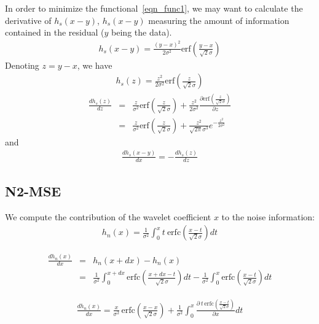 In order to minimize the functional~\ref{eqn_func1}, we may want to calculate
the derivative of $h_s(x-y)$, $h_s(x-y)$ measuring the amount of information
contained in the residual ($y$ being the data).
\begin{eqnarray}
h_s(x-y) = \frac{(y-x)^2}{2\sigma^2}\mbox{erf}(\frac{y-x}{\sqrt{2}\sigma}) 
\end{eqnarray}
Denoting $z = y - x$, we have
\begin{eqnarray}
h_s(z) = \frac{z^2}{2\sigma^2}\mbox{erf}(\frac{z}{\sqrt{2}\sigma}) 
\end{eqnarray}
\begin{eqnarray}
\frac{ d h_{s}(z)}{dz} & = & \frac{z}{\sigma^2}\mbox{erf}(\frac{z}{\sqrt{2}\sigma}) + \frac{z^2}{2\sigma^2} \frac{\partial \mbox{erf}(\frac{z}{\sqrt{2}\sigma})}{\partial z}  \\
                & = & \frac{z}{\sigma^2}\mbox{erf}(\frac{z}{\sqrt{2}\sigma}) + \frac{z^2}{\sqrt{2\pi}\sigma^3} e^{-\frac{z^{2}}{2\sigma^2}}
\end{eqnarray}
and
\begin{eqnarray}
\frac{ d h_{s}(x-y)}{dx}  =  - \frac{ d h_{s}(z)}{dz}
\end{eqnarray}


\subsection*{N2-MSE}
We compute the contribution of the wavelet coefficient $x$ to the noise information: 
\begin{eqnarray}
h_{n}(x) = 
\frac{1}{\sigma^{2}}\int_{0}^{x} t \: \mbox{erfc}( \frac{x-t}{\sqrt{2}\sigma}) dt 
\end{eqnarray}

\begin{eqnarray}
\frac{d h_{n}(x)}{dx} &  = &  h_{n}(x+dx) - h_{n}(x)  \\
   &  = & \frac{1}{\sigma^{2}} \int_{0}^{x+dx} 
             \mbox{erfc}(\frac{x+dx-t}{\sqrt{2}\sigma}) dt -
\frac{1}{\sigma^{2}}\int_{0}^{x} \mbox{erfc} (\frac{x-t}{\sqrt{2}\sigma}) dt 
\end{eqnarray}

\begin{eqnarray}
\frac{d h_{n}(x)}{dx} = 
\frac{x}{\sigma^{2}}  \, \mbox{erfc}( \frac{x-x}{\sqrt{2}\sigma})  +
\frac{1}{\sigma^{2}}\int_{0}^{x} 
          \frac{ \partial \: t \, \mbox{erfc} (\frac{x-t}{\sqrt{2}\sigma})}{ \partial x} dt 
\end{eqnarray}

